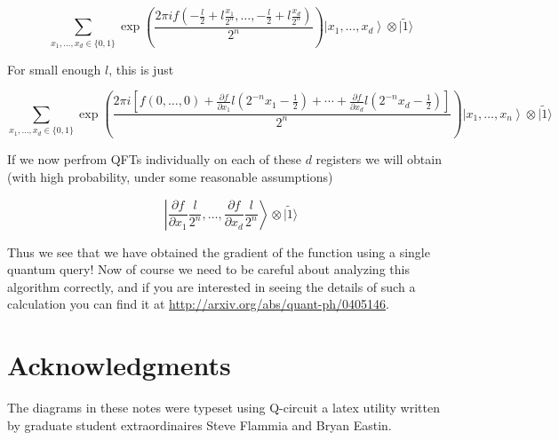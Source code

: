 \documentclass[10pt]{article}
\begin{document}
\begin{equation*}
\sum_{x_{1}, \ldots, x_{d} \in\{0,1\}} \exp \left(\frac{2 \pi i f\left(-\frac{l}{2}+l \frac{x_{1}}{2^{n}}, \ldots,-\frac{l}{2}+l \frac{x_{d}}{2^{n}}\right)}{2^{n}}\right)\left|x_{1}, \ldots, x_{d}\right\rangle \otimes|\tilde{1}\rangle \tag{36}
\end{equation*}


For small enough $l$, this is just


\begin{equation*}
\sum_{x_{1}, \ldots, x_{d} \in\{0,1\}} \exp \left(\frac{2 \pi i\left[f(0, \ldots, 0)+\frac{\partial f}{\partial x_{1}} l\left(2^{-n} x_{1}-\frac{1}{2}\right)+\cdots+\frac{\partial f}{\partial x_{d}} l\left(2^{-n} x_{d}-\frac{1}{2}\right)\right]}{2^{n}}\right)\left|x_{1}, \ldots, x_{n}\right\rangle \otimes|\tilde{1}\rangle \tag{37}
\end{equation*}


If we now perfrom QFTs individually on each of these $d$ registers we will obtain (with high probability, under some reasonable assumptions)


\begin{equation*}
\left|\frac{\partial f}{\partial x_{1}} \frac{l}{2^{n}}, \ldots, \frac{\partial f}{\partial x_{d}} \frac{l}{2^{n}}\right\rangle \otimes|\tilde{1}\rangle \tag{38}
\end{equation*}


Thus we see that we have obtained the gradient of the function using a single quantum query! Now of course we need to be careful about analyzing this algorithm correctly, and if you are interested in seeing the details of such a calculation you can find it at \href{http://arxiv.org/abs/quant-ph/0405146}{http://arxiv.org/abs/quant-ph/0405146}.

\section*{Acknowledgments}
The diagrams in these notes were typeset using Q-circuit a latex utility written by graduate student extraordinaires Steve Flammia and Bryan Eastin.
\end{document}
